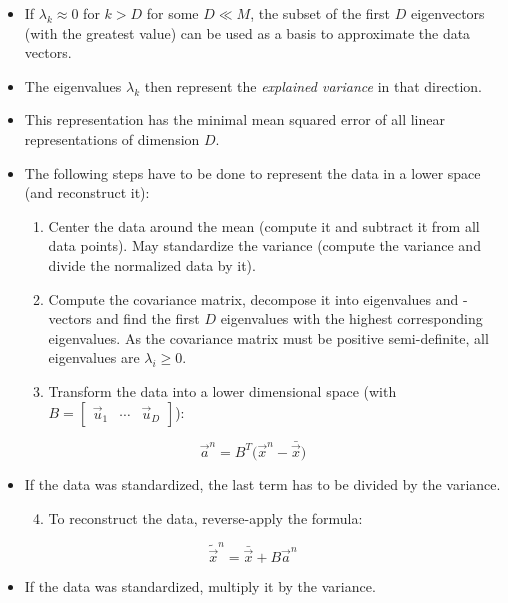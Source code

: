 			\begin{itemize}
				\item If \( \lambda_k \approx 0 \) for \( k > D \) for some \( D \ll M \), the subset of the first \(D\) eigenvectors (with the greatest value) can be used as a basis to approximate the data vectors.
				\item The eigenvalues \(\lambda_k\) then represent the \emph{explained variance} in that direction.
				\item This representation has the minimal mean squared error of all linear representations of dimension \(D\).
				\item The following steps have to be done to represent the data in a lower space (and reconstruct it):
					\begin{enumerate}
						\item Center the data around the mean (compute it and subtract it from all data points). May standardize the variance (compute the variance and divide the normalized data by it).
						\item Compute the covariance matrix, decompose it into eigenvalues and -vectors and find the first \(D\) eigenvalues with the highest corresponding eigenvalues. As the covariance matrix must be positive semi-definite, all eigenvalues are \( \lambda_i \geq 0 \).
						\item Transform the data into a lower dimensional space (with \( B = \begin{bmatrix} \vec{u}_1 & \cdots & \vec{u}_D \end{bmatrix} \)):
					\end{enumerate}
			\end{itemize}
			\begin{equation}
				\vec{a}^n = B^T \big( \vec{x}^n - \bar{\vec{x}} \big)
			\end{equation}
			\begin{itemize}
				\item[] If the data was standardized, the last term has to be divided by the variance.
					\begin{enumerate}
						\setcounter{enumi}{3}
						\item To reconstruct the data, reverse-apply the formula:
					\end{enumerate}
			\end{itemize}
			\begin{equation}
				\tilde{\vec{x}}^n = \bar{\vec{x}} + B \vec{a}^n
			\end{equation}
			\begin{itemize}
				\item[] If the data was standardized, multiply it by the variance.
			\end{itemize}
		
